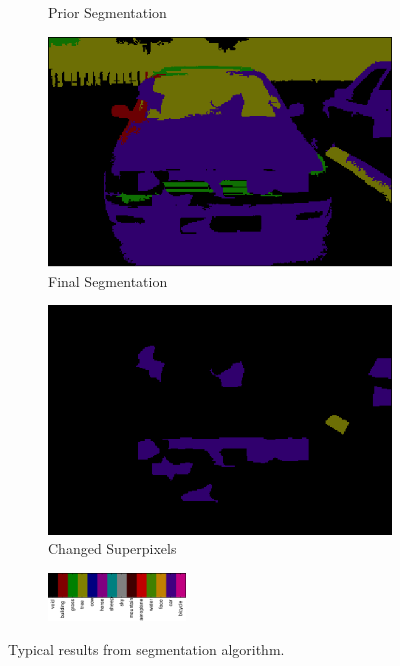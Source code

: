 \documentclass{article} %
\begin{document}
\begin{figure}[htb]
\begin{subfigure}[t]{0.19\textwidth}
		\parbox{0.95\textwidth}{\caption{Prior Segmentation \label{fig:prior_car}}}
	\end{subfigure}
	\begin{subfigure}[t]{0.19\textwidth}
		\centering
		\includegraphics[width = \textwidth]{./img/7_18_s_final.png}
		\parbox{0.95\textwidth}{\caption{Final Segmentation \label{fig:final_car}}}
	\end{subfigure}
	\begin{subfigure}[t]{0.19\textwidth}
		\centering
		\includegraphics[width = \textwidth]{./img/7_18_s_changed.png}
		\parbox{0.95\textwidth}{\caption{Changed Superpixels \label{fig:changed_car}}}
	\end{subfigure}


	\begin{subfigure}[t]{\textwidth}
		\centering
		\includegraphics[width = 0.4\textwidth]{./img/legend-rot.png}
	\end{subfigure}
	\caption{Typical results from segmentation algorithm.}
	\label{fig:result}
\end{figure}
\end{document}
